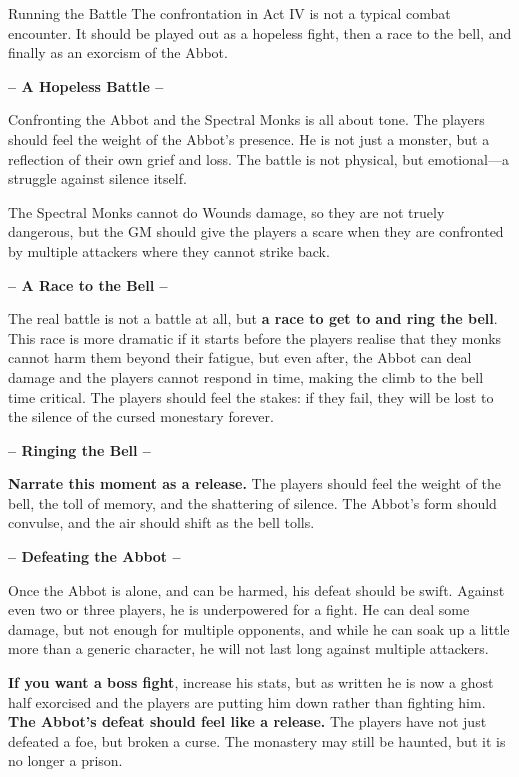 \begin{paracol}{2}
    \switchcolumn
    \vspace*{5.5cm}
\begin{CommentBox}{Running the Battle}
    The confrontation in Act IV is not a typical combat encounter. It should be played out as a hopeless fight, then a race to the bell, and finally as an exorcism of the Abbot. 

    \begin{center}
        \textbf{-- A Hopeless Battle --}
    \end{center}

    Confronting the Abbot and the Spectral Monks is all about tone. The players should feel the weight of the Abbot’s presence. He is not just a monster, but a reflection of their own grief and loss. The battle is not physical, but emotional—a struggle against silence itself.

    The Spectral Monks cannot do Wounds damage, so they are not truely dangerous, but the GM should give the players a scare when they are confronted by multiple attackers where they cannot strike back.

    \begin{center}
        \textbf{-- A Race to the Bell --}
    \end{center}

    The real battle is not a battle at all, but \textbf{a race to get to and ring the bell}. This race is more dramatic if it starts before the players realise that they monks cannot harm them beyond their fatigue, but even after, the Abbot can deal damage and the players cannot respond in time, making the climb to the bell time critical.  The players should feel the stakes: if they fail, they will be lost to the silence of the cursed monestary forever.
    
    \begin{center}
        \textbf{-- Ringing the Bell --}
    \end{center}

    \textbf{Narrate this moment as a release.} The players should feel the weight of the bell, the toll of memory, and the shattering of silence. The Abbot’s form should convulse, and the air should shift as the bell tolls. 

    \begin{center}
        \textbf{-- Defeating the Abbot --}
    \end{center}

    Once the Abbot is alone, and can be harmed, his defeat should be swift. Against even two or three players, he is underpowered for a fight. He can deal some damage, but not enough for multiple opponents, and while he can soak up a little more than a generic character, he will not last long against multiple attackers.
    
    \textbf{If you want a boss fight}, increase his stats, but as written he is now a ghost half exorcised and the players are putting him down rather than fighting him. \textbf{The Abbot’s defeat should feel like a release.} The players have not just defeated a foe, but broken a curse. The monastery may still be haunted, but it is no longer a prison.
\end{CommentBox}
\end{paracol}
